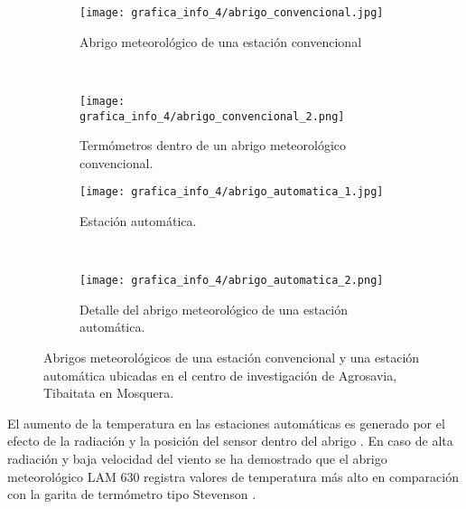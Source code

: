 \begin{figure}[H]
	
	\begin{subfigure}[normla]{0.4\textwidth}
	\centering
	\texttt{[image: grafica\_info\_4/abrigo\_convencional.jpg]}
		
		\caption{Abrigo meteorológico de una estación convencional}		
		\label{gra:convencional_1}
		
	\end{subfigure}
~
	\begin{subfigure}[normla]{0.4\textwidth}
	\centering
	\texttt{[image: grafica\_info\_4/abrigo\_convencional\_2.png]}
		
	\caption{Termómetros dentro de un abrigo meteorológico convencional.}		
	\label{gra:convencional_2}
		
	\end{subfigure}
	\begin{subfigure}[normla]{0.4\textwidth}
	\centering
	\texttt{[image: grafica\_info\_4/abrigo\_automatica\_1.jpg]}
		
		\caption{Estación automática.}		
		\label{gra:autom_1}
		
	\end{subfigure}
~
	\begin{subfigure}[normla]{0.4\textwidth}
	\centering
	\texttt{[image: grafica\_info\_4/abrigo\_automatica\_2.png]}
		
		\caption{Detalle del abrigo meteorológico de una estación automática.}		
		\label{gra:autom_2}
		
	\end{subfigure}	
	
	
	\caption{Abrigos meteorológicos de una estación convencional y una estación automática ubicadas en el centro de investigación de Agrosavia, Tibaitata en Mosquera.}		
	\label{graph:evol_tmp_sabana} 
		
\end{figure}

El aumento de la temperatura en las estaciones automáticas es generado por el efecto de la radiación y la posición del sensor dentro del abrigo \citep{kaspar2016climate}. En caso de alta radiación y baja velocidad del viento se ha demostrado que el abrigo meteorológico LAM 630 registra valores de temperatura más alto en comparación con la garita de termómetro tipo Stevenson \citep{lacombe2010results, kaspar2016climate}.

